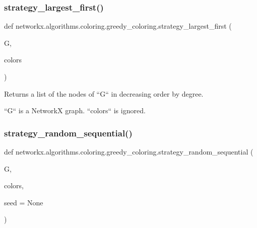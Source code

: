 \subsubsection{\texorpdfstring{strategy\+\_\+largest\+\_\+first()}{strategy\_largest\_first()}}
{\footnotesize\ttfamily def networkx.\+algorithms.\+coloring.\+greedy\+\_\+coloring.\+strategy\+\_\+largest\+\_\+first (\begin{DoxyParamCaption}\item[{}]{G,  }\item[{}]{colors }\end{DoxyParamCaption})}

\begin{DoxyVerb}Returns a list of the nodes of ``G`` in decreasing order by
degree.

``G`` is a NetworkX graph. ``colors`` is ignored.\end{DoxyVerb}
 \mbox{\label{namespacenetworkx_1_1algorithms_1_1coloring_1_1greedy__coloring_a9fd080840fb234083cbbf22d40481e23}} 
\subsubsection{\texorpdfstring{strategy\+\_\+random\+\_\+sequential()}{strategy\_random\_sequential()}}
{\footnotesize\ttfamily def networkx.\+algorithms.\+coloring.\+greedy\+\_\+coloring.\+strategy\+\_\+random\+\_\+sequential (\begin{DoxyParamCaption}\item[{}]{G,  }\item[{}]{colors,  }\item[{}]{seed = {\ttfamily None} }\end{DoxyParamCaption})}

